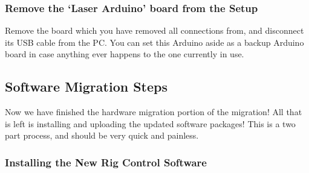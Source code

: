 \documentclass{article}
\begin{document}
\subsubsection{Remove the `Laser Arduino' board from the Setup}
Remove the board which you have removed all connections from, and disconnect its USB cable from the PC. You can set this 
Arduino aside as a backup Arduino board in case anything ever happens to the one currently in use.
\newpage 

\subsection{Software Migration Steps}
Now we have finished the hardware migration portion of the migration! All that is left is installing and uploading the updated software packages! This is a two part process, and should be 
very quick and painless. 
\subsubsection{Installing the New Rig Control Software}
\end{document}
